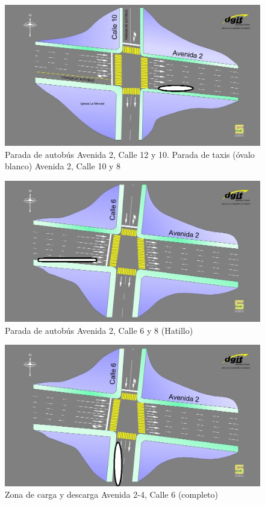 \begin{figure}[H]
	\centering
	\includegraphics[scale=0.4]{images/Parada_A2Ca10-08.jpg}
	\caption{Parada de autob\'{u}s Avenida 2, Calle 12 y 10. Parada de taxis (\'{o}valo blanco) Avenida 2, Calle 10 y 8}
	\label{fig:stopAv2Ca1008}
\end{figure}

\begin{figure}[H]
	\centering
	\includegraphics[scale=0.40]{images/Parada_A2Ca8-6.jpg}
	\caption{Parada de autob\'{u}s Avenida 2, Calle 6 y 8 (Hatillo)}
	\label{fig:stopAv2Ca0806}
\end{figure}

\begin{figure}[H]
	\centering
	\includegraphics[scale=0.40]{images/Parada_A2-04Ca06.jpg}
	\caption{Zona de carga y descarga Avenida 2-4, Calle 6 (completo)}
	\label{fig:stopAv0204Ca6}
\end{figure}

